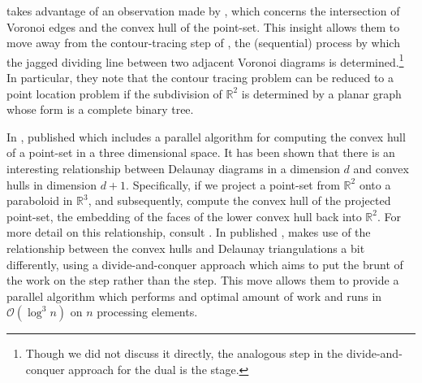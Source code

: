 \documentclass[12pt,twoside]{reedthesis}
\begin{document}
    \citeauthor{goodrich1985} takes advantage of an observation made by \citeauthor{aggarwal}, which concerns the intersection of Voronoi edges and the convex hull of the point-set. This insight allows them to move away from the contour-tracing step of \citeauthor{shamos_hoey}, the (sequential) process by which the jagged dividing line between two adjacent Voronoi diagrams is determined.\footnote{Though we did not discuss it directly, the analogous step in the divide-and-conquer approach for the dual is the  stage.} In particular, they note that the contour tracing problem can be reduced to a point location problem if the subdivision of $\mathds{R}^2$ is determined by a planar graph whose form is a complete binary tree.\par

    In \citeyear{goodrich1993}, \citeauthor{goodrich1993} published  which includes a parallel algorithm for computing the convex hull of a point-set in a three dimensional space. It has been shown that there is an interesting relationship between Delaunay diagrams in a dimension $d$ and convex hulls in dimension $d+1$. Specifically, if we project a point-set from $\mathds{R}^2$ onto a paraboloid in $\mathds{R}^3$, and subsequently, compute the convex hull of the projected point-set, the embedding of the faces of the lower convex hull back into $\mathds{R}^2$. For more detail on this relationship, consult \textcite{del_book}.  In \citeyear{blelloch_div_conq} \citeauthor{blelloch_div_conq} published , makes use of the relationship between the convex hulls and Delaunay triangulations a bit differently, using a divide-and-conquer approach which aims to put the brunt of the work on the  step rather than the  step. This move allows them to provide a parallel algorithm which performs and optimal amount of work and runs in $\mathcal{O}(\log^3 n)$ on $n$ processing elements. \par
\end{document}
